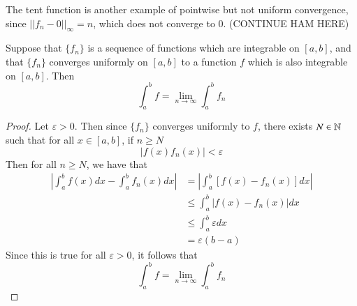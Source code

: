 \documentclass[12pt, a4paper, oneside, openright, titlepage]{book}
\begin{document}
The tent function is another example of pointwise but not uniform convergence, since $||f_n-0||_{\infty} = n$, which does not converge to $0$. (CONTINUE HAM HERE)


\begin{thm}
    Suppose that $\{f_n\}$ is a sequence of functions which are integrable on $[a,b]$, and that $\{f_n\}$ converges uniformly on $[a,b]$ to a function $f$ which is also integrable on $[a,b]$. Then \begin{equation*}
        \int_a^bf = \lim\limits_{n\rightarrow \infty}\int_a^bf_n
    \end{equation*}
\end{thm}
\begin{proof}
    Let $\varepsilon > 0$. Then since $\{f_n\}$ converges uniformly to $f$, there exists $N \in \mathbb N$ such that for all $x \in [a,b]$, if $n \geq N$ \begin{equation*}
        |f(x) f_n(x)| < \varepsilon
    \end{equation*}
    Then for all $n \geq N$, we have that \begin{align*}
        \left|\int_a^bf(x)dx - \int_a^bf_n(x)dx\right| &= \left|\int_a^b[f(x) - f_n(x)]dx\right| \\
        &\leq \int_a^b |f(x) - f_n(x)| dx \\
        &\leq \int_a^b\varepsilon dx \\
        &= \varepsilon (b-a)
    \end{align*}
    Since this is true for all $\varepsilon > 0$, it follows that \begin{equation*}
        \int_a^bf = \lim\limits_{n\rightarrow \infty}\int_a^bf_n
    \end{equation*}
\end{proof}
\end{document}
